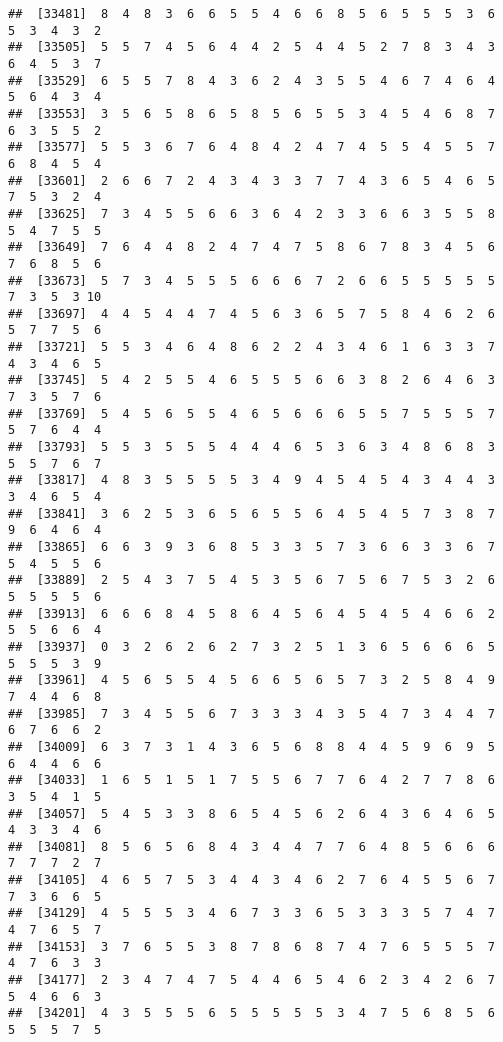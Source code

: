 \documentclass[
]{book}
\begin{document}
\begin{verbatim}
##  [33481]  8  4  8  3  6  6  5  5  4  6  6  8  5  6  5  5  5  3  6  5  3  4  3  2
##  [33505]  5  5  7  4  5  6  4  4  2  5  4  4  5  2  7  8  3  4  3  6  4  5  3  7
##  [33529]  6  5  5  7  8  4  3  6  2  4  3  5  5  4  6  7  4  6  4  5  6  4  3  4
##  [33553]  3  5  6  5  8  6  5  8  5  6  5  5  3  4  5  4  6  8  7  6  3  5  5  2
##  [33577]  5  5  3  6  7  6  4  8  4  2  4  7  4  5  5  4  5  5  7  6  8  4  5  4
##  [33601]  2  6  6  7  2  4  3  4  3  3  7  7  4  3  6  5  4  6  5  7  5  3  2  4
##  [33625]  7  3  4  5  5  6  6  3  6  4  2  3  3  6  6  3  5  5  8  5  4  7  5  5
##  [33649]  7  6  4  4  8  2  4  7  4  7  5  8  6  7  8  3  4  5  6  7  6  8  5  6
##  [33673]  5  7  3  4  5  5  5  6  6  6  7  2  6  6  5  5  5  5  5  7  3  5  3 10
##  [33697]  4  4  5  4  4  7  4  5  6  3  6  5  7  5  8  4  6  2  6  5  7  7  5  6
##  [33721]  5  5  3  4  6  4  8  6  2  2  4  3  4  6  1  6  3  3  7  4  3  4  6  5
##  [33745]  5  4  2  5  5  4  6  5  5  5  6  6  3  8  2  6  4  6  3  7  3  5  7  6
##  [33769]  5  4  5  6  5  5  4  6  5  6  6  6  5  5  7  5  5  5  7  5  7  6  4  4
##  [33793]  5  5  3  5  5  5  4  4  4  6  5  3  6  3  4  8  6  8  3  5  5  7  6  7
##  [33817]  4  8  3  5  5  5  5  3  4  9  4  5  4  5  4  3  4  4  3  3  4  6  5  4
##  [33841]  3  6  2  5  3  6  5  6  5  5  6  4  5  4  5  7  3  8  7  9  6  4  6  4
##  [33865]  6  6  3  9  3  6  8  5  3  3  5  7  3  6  6  3  3  6  7  5  4  5  5  6
##  [33889]  2  5  4  3  7  5  4  5  3  5  6  7  5  6  7  5  3  2  6  5  5  5  5  6
##  [33913]  6  6  6  8  4  5  8  6  4  5  6  4  5  4  5  4  6  6  2  5  5  6  6  4
##  [33937]  0  3  2  6  2  6  2  7  3  2  5  1  3  6  5  6  6  6  5  5  5  5  3  9
##  [33961]  4  5  6  5  5  4  5  6  6  5  6  5  7  3  2  5  8  4  9  7  4  4  6  8
##  [33985]  7  3  4  5  5  6  7  3  3  3  4  3  5  4  7  3  4  4  7  6  7  6  6  2
##  [34009]  6  3  7  3  1  4  3  6  5  6  8  8  4  4  5  9  6  9  5  6  4  4  6  6
##  [34033]  1  6  5  1  5  1  7  5  5  6  7  7  6  4  2  7  7  8  6  3  5  4  1  5
##  [34057]  5  4  5  3  3  8  6  5  4  5  6  2  6  4  3  6  4  6  5  4  3  3  4  6
##  [34081]  8  5  6  5  6  8  4  3  4  4  7  7  6  4  8  5  6  6  6  7  7  7  2  7
##  [34105]  4  6  5  7  5  3  4  4  3  4  6  2  7  6  4  5  5  6  7  7  3  6  6  5
##  [34129]  4  5  5  5  3  4  6  7  3  3  6  5  3  3  3  5  7  4  7  4  7  6  5  7
##  [34153]  3  7  6  5  5  3  8  7  8  6  8  7  4  7  6  5  5  5  7  4  7  6  3  3
##  [34177]  2  3  4  7  4  7  5  4  4  6  5  4  6  2  3  4  2  6  7  5  4  6  6  3
##  [34201]  4  3  5  5  5  6  5  5  5  5  5  3  4  7  5  6  8  5  6  5  5  5  7  5

\end{verbatim}
\end{document}
